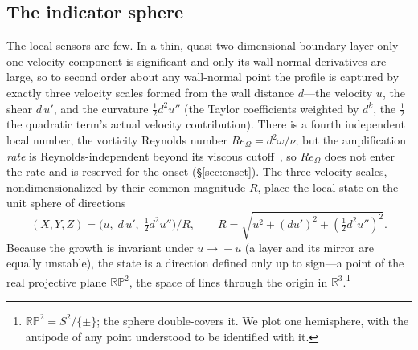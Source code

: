 \documentclass[journal]{new-aiaa}
\begin{document}
\subsection{The indicator sphere}\label{sec:sphere}
The local sensors are few. In a thin, quasi-two-dimensional boundary layer only
one velocity component is significant and only its wall-normal derivatives are
large, so to second order about any wall-normal point the profile is captured by
exactly three velocity scales formed from the wall distance $d$---the velocity $u$, the shear
$d\,u'$, and the curvature $\tfrac12 d^2u''$ (the Taylor coefficients weighted
by $d^{k}$, the $\tfrac12$ the quadratic term's actual velocity contribution).
There is a fourth independent local number, the vorticity Reynolds number
$Re_\Omega=d^2\omega/\nu$; but the amplification \emph{rate} is
Reynolds-independent beyond its viscous cutoff~\cite{drela_giles_1987}, so
$Re_\Omega$ does not enter the rate and is reserved for the onset
(\S\ref{sec:onset}). The three velocity scales, nondimensionalized by their
common magnitude $R$, place the local state on the unit sphere of directions
\begin{equation}
  (X,Y,Z) = \big(u,\; d\,u',\; \tfrac12 d^2 u''\big)\big/R,
  \qquad R=\sqrt{u^2+(d u')^2+(\tfrac12 d^2u'')^2}.
  \label{eq:indicators}
\end{equation}
Because the growth is invariant under $u\!\to\!-u$ (a layer and its mirror are
equally unstable), the state is a direction defined only up to sign---a point
of the real projective plane $\mathbb{RP}^2$, the space of lines through the
origin in $\mathbb{R}^3$.\footnote{$\mathbb{RP}^2=S^2/\{\pm\}$; the sphere
double-covers it. We plot one hemisphere, with the antipode of any point
understood to be identified with it.}
\end{document}
